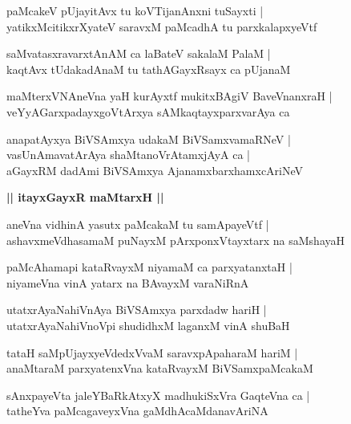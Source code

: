 \documentclass[twoside,12pt,openright]{book}
\newcounter{shloka}[chapter]
\def\uvaca#1{\centerline{{\large\textbf{#1}}}}
\begin{document}
\begin{shloka}%
paMcakeV pUjayitAvx tu koVTijanAnxni tuSayxti |\\
yatikxMcitikxrXyateV saravxM paMcadhA tu parxkalapxyeVtf 
\end{shloka}

\begin{shloka}%
saMvatasxravarxtAnAM ca laBateV sakalaM PalaM |\\
kaqtAvx tUdakadAnaM tu tathAGayxRsayx ca pUjanaM 
\end{shloka}

\begin{shloka}%
maMterxVNAneVna yaH kurAyxtf mukitxBAgiV BaveVnanxraH |\\
veYyAGarxpadayxgoVtArxya sAMkaqtayxparxvarAya ca 
\end{shloka}

\begin{shloka}%
anapatAyxya BiVSAmxya udakaM BiVSamxvamaRNeV |\\
vasUnAmavatArAya shaMtanoVrAtamxjAyA ca |\\
aGayxRM dadAmi BiVSAmxya AjanamxbarxhamxcAriNeV
\end{shloka}

\uvaca{|| itayxGayxR maMtarxH ||}

\begin{shloka}%
aneVna vidhinA yasutx paMcakaM tu samApayeVtf |\\
ashavxmeVdhasamaM puNayxM pArxponxVtayxtarx na saMshayaH 
\end{shloka}

\begin{shloka}%
paMcAhamapi kataRvayxM niyamaM ca parxyatanxtaH |\\
niyameVna vinA yatarx na BAvayxM varaNiRnA 
\end{shloka}

\begin{shloka}%
utatxrAyaNahiVnAya BiVSAmxya parxdadw hariH |\\
utatxrAyaNahiVnoVpi shudidhxM laganxM vinA shuBaH 
\end{shloka}

\begin{shloka}%
tataH saMpUjayxyeVdedxVvaM saravxpApaharaM hariM |\\
anaMtaraM parxyatenxVna kataRvayxM BiVSamxpaMcakaM 
\end{shloka}

\begin{shloka}%
sAnxpayeVta jaleYBaRkAtxyX madhukiSxVra GaqteVna ca |\\
tatheYva paMcagaveyxVna gaMdhAcaMdanavAriNA 
\end{shloka}
\end{document}
